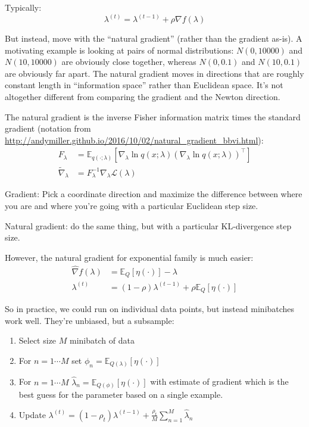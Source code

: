 \documentclass{article}
\newcommand{\E}{ \ensuremath{ \mathbb{E} }}
\begin{document}
Typically:
\begin{equation*}
  \lambda^{(t)}=\lambda^{(t-1)}+\rho\nabla f(\lambda)
\end{equation*}

But instead, move with the ``natural gradient'' (rather than the gradient as-is). A motivating example is looking at
pairs of normal distributions: $N(0, 10000)$ and $N(10, 10000)$ are obviously close together, whereas $N(0, 0.1)$ and $N(10, 0.1)$
are obviously far apart. The natural gradient moves in directions that are roughly constant length in ``information space''
rather than Euclidean space. It's not altogether different from comparing the gradient and the Newton direction.

The natural gradient is the inverse Fisher information matrix times the standard gradient (notation from \url{http://andymiller.github.io/2016/10/02/natural_gradient_bbvi.html}):
\begin{align*}
  F_\lambda &= \mathbb{E}_{q(\cdot; \lambda)} \left[ \nabla_\lambda \ln q(x; \lambda) \left( \nabla_\lambda \ln q(x; \lambda) \right)^\intercal \right]
  \\
  \tilde \nabla_\lambda &= F_\lambda^{-1} \nabla_\lambda \mathcal{L}(\lambda)
\end{align*}

Gradient: Pick a coordinate direction
and maximize the difference between where you are and where you're going with a particular Euclidean step size.

Natural gradient: do the same thing, but with a particular KL-divergence step size.

However, the natural gradient for exponential family is much easier:
\begin{align*}
  \hat{\nabla} f(\lambda) &= \E_Q \left[ \eta(\cdot) \right] - \lambda
  \\
  \lambda^{(t)}&=(1-\rho)\lambda^{(t-1)}+\rho \E_Q \left[ \eta(\cdot) \right]
\end{align*}

So in practice, we could run on individual data points, but instead minibatches work well. They're unbiased, but
a subsample:
\begin{enumerate}
  \item Select size $M$ minibatch of data
  \item For $n=1\cdots M$ set $\phi_n=\E_{Q(\lambda)}\left[ \eta(\cdot) \right]$
  \item For $n=1\cdots M$ $\hat{\lambda}_n=\E_{Q(\phi)}\left[ \eta(\cdot) \right]$ with estimate of gradient which is the
  best guess for the parameter based on a single example.
  \item Update $\lambda^{(t)}=(1-\rho_t)\lambda^{(t-1)}+\frac{\rho_t}{M}\sum_{n=1}^M \hat{\lambda}_n$
\end{enumerate}
\end{document}
